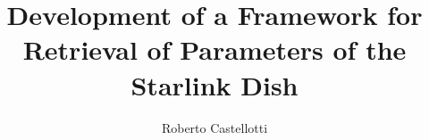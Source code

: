\usepackage[utf8]{inputenc}
\usepackage{packages}
\usepackage{beamermods}

\author[Roberto Castellotti]{Roberto Castellotti}
\title[IDP]{Development of a Framework for Retrieval of Parameters of the Starlink Dish}


\usepackage{pgfpages}
\usepackage{ifthen}
\newif\ifsolution%

\makeatletter
\let\@@magyar@captionfix\relax
\makeatother
